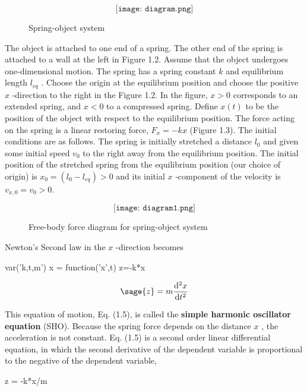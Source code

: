 \begin{figure}[h!]
$$\texttt{[image: diagram.png]}$$
\caption{Spring-object system}
\end{figure}

The object is attached to one end of a spring. The other end of the spring is attached to a wall at the left in Figure 1.2. Assume that the object undergoes one-dimensional motion. The spring has a spring constant $k$ and equilibrium length $l_{eq}$ . Choose the origin at the equilibrium position and choose the positive $x$ -direction to the right in the Figure 1.2. In the figure, $x > 0$ corresponds to an extended spring, and $x < 0$ to a compressed spring. Define $x(t)$ to be the position of the object with respect to the equilibrium position. The force acting on the spring is a linear restoring force, $F_{x} = −k x$ (Figure 1.3). The initial conditions are as follows. The spring is initially stretched a distance $l_{0}$ and given some initial speed $v_{0}$ to the right away from the equilibrium position. The initial position of the stretched spring from the equilibrium position (our choice of origin) is $x_{0} = (l_{0}-l_{eq} ) > 0$ and its initial $x$ -component of the velocity is $v_{x,0} = v_{0} > 0$. 

\begin{figure}[h!]
$$\texttt{[image: diagram1.png]}$$
\caption{Free-body force diagram for spring-object system}
\end{figure}

Newton’s Second law in the $x$ -direction becomes

\begin{sagesilent}
var('k,t,m')
x = function('x',t)
z=-k*x
\end{sagesilent}

\begin{equation}
\sage{z} =  m\frac{\mathrm{d}^{2}x}{\mathrm{d}t^{2}}
\end{equation}

This equation of motion, Eq. (1.5), is called the \textbf{simple harmonic oscillator equation} (SHO). Because the spring force depends on the distance $x$ , the acceleration is not constant. Eq. (1.5) is a second order linear differential equation, in which the second derivative of the dependent variable is proportional to the negative of the dependent variable,

\begin{sagesilent}
z = -k*x/m
\end{sagesilent}

